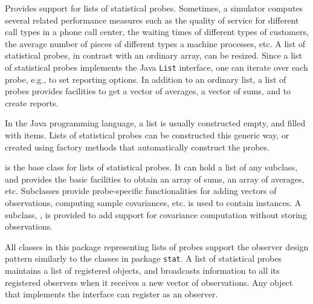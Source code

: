 
\label{over-li-tal}
Provides support for lists of statistical probes.
Sometimes, a simulator computes several related performance measures
such as the quality of service for different call types in a phone
call center, the waiting times of different types of customers, the
average number of pieces of different types a machine processes, etc.
A list of statistical probes, in contrast with an ordinary array, can
be resized.  Since a list of statistical probes implements
the Java \texttt{List} interface, one can iterate over each probe,
e.g., to set reporting options.
In addition to an ordinary list, a list of probes
provides facilities to get a vector of averages, a vector of sums,
and to create reports.

In the Java programming language,
a list is usually constructed empty, and filled with items.  Lists of
statistical probes can be constructed this generic way, or created
using factory methods that automatically construct the probes.

 is
the base class for
lists of statistical probes.  It can hold a list of any
 subclass, and
provides the basic
facilities to obtain an array of sums, an array of averages, etc.
Subclasses provide probe-specific functionalities for adding
vectors of observations, computing sample covariances, etc.
 is
used to contain  instances.
A subclass,
, is
provided to add support for covariance computation without storing observations.
\iffalse
The \externalclass{umontreal.iro.lecuyer.stat.list}{ListOfFunctionOfMultipleMeansTallies}
is available to regroup
\externalclass{umontreal.iro.lecuyer.stat}{FunctionOfMultipleMeansTally}
objects.
\fi

All classes in this package representing lists of probes support the
observer design pattern
similarly to the classes in package \texttt{stat}.
A list of statistical probes maintains a list of registered 
objects, and broadcasts information to all its registered
observers when it receives a new vector of observations.
Any object that implements the interface 
can register as an observer.
